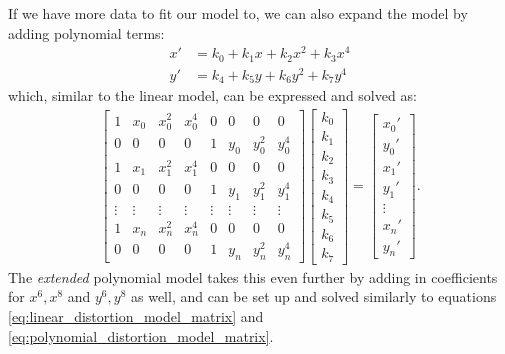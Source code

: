 \documentclass[11pt, letterpaper]{extarticle} %
\begin{document}
If we have more data to fit our model to, we can also expand the model by adding polynomial terms:
\begin{align}
    x' &= k_0 + k_1 x + k_2 x^2 + k_3 x^4 \\
    y' &= k_4 + k_5 y + k_6 y^2 + k_7 y^4
\end{align}
which, similar to the linear model, can be expressed and solved as:
\begin{align} \label{eq:polynomial_distortion_model_matrix}
    \begin{bmatrix}
        1 & x_0 & x_0^2 & x_0^4 & 0 & 0 & 0 & 0\\
        0 & 0 & 0 & 0 & 1 & y_0 & y_0^2 & y_0^4\\
        1 & x_1 & x_1^2 & x_1^4 & 0 & 0 & 0 & 0\\
        0 & 0 & 0 & 0 & 1 & y_1 & y_1^2 & y_1^4\\
        \vdots & \vdots & \vdots & \vdots & \vdots & \vdots & \vdots & \vdots\\
        1 & x_n & x_n^2 & x_n^4 & 0 & 0 & 0 & 0\\
        0 & 0 & 0 & 0 & 1 & y_n & y_n^2 & y_n^4
    \end{bmatrix}
    \begin{bmatrix}
        k_0 \\ k_1 \\ k_2 \\ k_3 \\ k_4 \\ k_5 \\ k_6 \\ k_7
    \end{bmatrix}
    =
    \begin{bmatrix}
        x_0' \\ y_0' \\ x_1' \\ y_1' \\ \vdots \\ x_n' \\ y_n'
    \end{bmatrix}.
\end{align}
The \textit{extended} polynomial model takes this even further by adding in coefficients for $x^6, x^8$ and $y^6, y^8$ as well, and can be set up and solved similarly to equations \ref{eq:linear_distortion_model_matrix} and \ref{eq:polynomial_distortion_model_matrix}.
\end{document}
